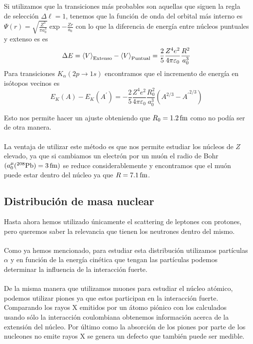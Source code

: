 Si utilizamos que la transiciones más probables son aquellas que siguen la regla de selección $\Delta \ell =1$, tenemos que la función de onda del orbital más interno es $\Psi(r)=\displaystyle \sqrt{\frac{Z^3}{\pi a_0^3}}\exp{-\frac{Zr}{a_0}}$ con lo que la diferencia de energía entre núcleos puntuales y extenso es es 
\begin{equation}
    \Delta E=\expval{V}_\mathrm{Extenso}-\expval{V}_\mathrm{Puntual}=\frac{2}{5} \frac{Z^4e^2}{4\pi\varepsilon_0}\frac{R^2}{a_0^3}
\end{equation}
Para transiciones $K_\alpha (2p \xrightarrow{} 1s)$ encontramos que el incremento de energía en isótopos vecinos es
\begin{equation*}
    E_K(A)-E_K(A^{\prime})=-\frac{2}{5}\frac{Z^4e^2}{4\pi\varepsilon_0}\frac{R_0^2}{a_0^3}{\left(A^{2/3}-{A^{\prime }}^{2/3}\right)}
\end{equation*}

Esto nos permite hacer un ajuste obteniendo que $R_0=\unit[1.2]{fm}$ como no podía ser de otra manera.\\\\
La ventaja de utilizar este método es que nos permite estudiar los núcleos de $Z$ elevado, ya que si cambiamos un electrón por un muón el radio de Bohr $(a_0^\mu(\mathrm{^{208}Pb})=\unit[3]{fm})$ se reduce considerablemente y encontramos que el muón puede estar dentro del núcleo ya que $R=\unit[7.1]{fm}$.
\subsection{Distribución de masa nuclear}
Hasta ahora hemos utilizado únicamente el scattering de leptones con protones, pero queremos saber la relevancia que tienen los neutrones dentro del mismo.\\\\
Como ya hemos mencionado, para estudiar esta distribución utilizamos partículas $\alpha$ y en función de la energía cinética que tengan las partículas podemos determinar la influencia de la interacción fuerte.\\\\
De la misma manera que utilizamos muones para estudiar el núcleo atómico, podemos utilizar piones ya que estos participan en la interacción fuerte. Comparando los rayos X emitidos por un átomo piónico con los calculados usando sólo la interacción coulombiana obtenemos información acerca de la extensión del núcleo. Por último como la absorción de los piones por parte de los nucleones no emite rayos X se genera un defecto que también puede ser medible.
\newpage

